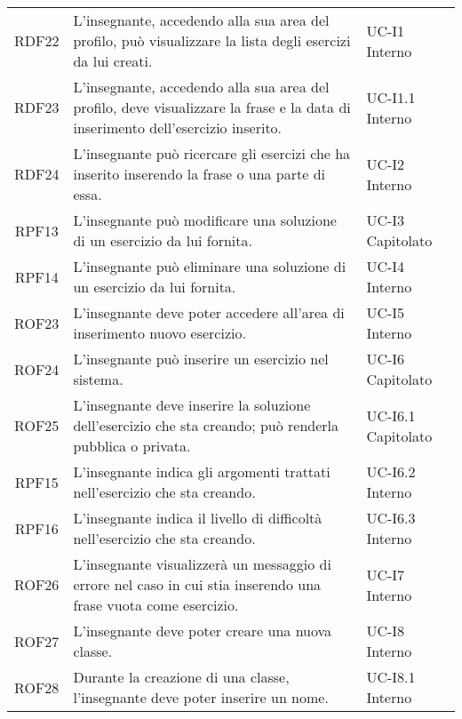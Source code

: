 \begin{tabularx}{\textwidth}{| c | p{10cm} | X |}
		RDF22 & L'insegnante, accedendo alla sua area del profilo, può visualizzare la lista degli esercizi da lui creati. & UC-I1 \newline Interno\\
		RDF23 & L'insegnante, accedendo alla sua area del profilo, deve visualizzare la frase e la data di inserimento dell'esercizio inserito. & UC-I1.1 \newline Interno\\
		RDF24 & L'insegnante può ricercare gli esercizi che ha inserito inserendo la frase o una parte di essa. & UC-I2 \newline Interno\\
		RPF13 & L'insegnante può modificare una soluzione di un esercizio da lui fornita. & UC-I3 \newline Capitolato\\
		RPF14 & L'insegnante può eliminare una soluzione di un esercizio da lui fornita. & UC-I4 \newline Interno\\
		ROF23 & L'insegnante deve poter accedere all'area di inserimento nuovo esercizio. & UC-I5 \newline Interno\\		
		ROF24 & L'insegnante può inserire un esercizio nel sistema. & UC-I6 \newline Capitolato\\
		ROF25 & L'insegnante deve inserire la soluzione dell'esercizio che sta creando; può renderla pubblica o privata. & UC-I6.1 \newline Capitolato\\
		RPF15 & L'insegnante indica gli argomenti trattati nell'esercizio che sta creando. & UC-I6.2 \newline Interno\\
		RPF16 & L'insegnante indica il livello di difficoltà nell'esercizio che sta creando. & UC-I6.3 \newline Interno\\
		ROF26 & L'insegnante visualizzerà un messaggio di errore nel caso in cui stia inserendo una frase vuota come esercizio. & UC-I7 \newline Interno\\
		ROF27 & L'insegnante deve poter creare una nuova classe. & UC-I8 \newline Interno\\
		ROF28 & Durante la creazione di una classe, l'insegnante deve poter inserire un nome. & UC-I8.1 \newline Interno\\

\end{tabularx}
